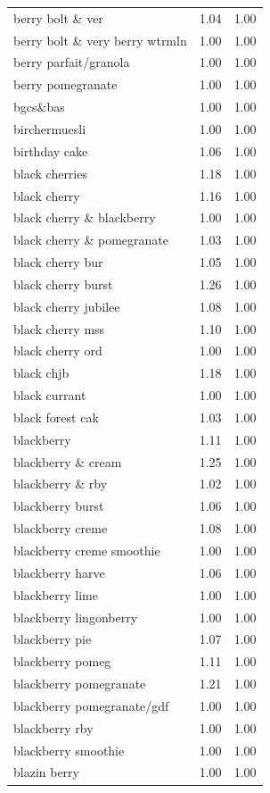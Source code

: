 \begin{table}
\begin{tabular}{lrr}
berry bolt \& ver & 1.04 & 1.00 \\
berry bolt \& very berry wtrmln & 1.00 & 1.00 \\
berry parfait/granola & 1.00 & 1.00 \\
berry pomegranate & 1.00 & 1.00 \\
bgcs\&bas & 1.00 & 1.00 \\
birchermuesli & 1.00 & 1.00 \\
birthday cake & 1.06 & 1.00 \\
black cherries & 1.18 & 1.00 \\
black cherry & 1.16 & 1.00 \\
black cherry \& blackberry & 1.00 & 1.00 \\
black cherry \& pomegranate & 1.03 & 1.00 \\
black cherry bur & 1.05 & 1.00 \\
black cherry burst & 1.26 & 1.00 \\
black cherry jubilee & 1.08 & 1.00 \\
black cherry mss & 1.10 & 1.00 \\
black cherry ord & 1.00 & 1.00 \\
black chjb & 1.18 & 1.00 \\
black currant & 1.00 & 1.00 \\
black forest cak & 1.03 & 1.00 \\
blackberry & 1.11 & 1.00 \\
blackberry \& cream & 1.25 & 1.00 \\
blackberry \& rby & 1.02 & 1.00 \\
blackberry burst & 1.06 & 1.00 \\
blackberry creme & 1.08 & 1.00 \\
blackberry creme smoothie & 1.00 & 1.00 \\
blackberry harve & 1.06 & 1.00 \\
blackberry lime & 1.00 & 1.00 \\
blackberry lingonberry & 1.00 & 1.00 \\
blackberry pie & 1.07 & 1.00 \\
blackberry pomeg & 1.11 & 1.00 \\
blackberry pomegranate & 1.21 & 1.00 \\
blackberry pomegranate/gdf & 1.00 & 1.00 \\
blackberry rby & 1.00 & 1.00 \\
blackberry smoothie & 1.00 & 1.00 \\
blazin berry & 1.00 & 1.00 \\

\end{tabular}
\end{table}
